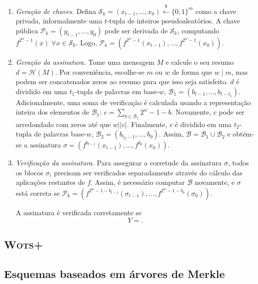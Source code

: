 \documentclass{article}
\newcommand{\pk}{$\mathcal{P}_k$}
\newcommand{\sk}{$\mathcal{S}_k$}
\newcommand{\length}[1]{\vert #1 \vert}
\begin{document}
\begin{enumerate}
    \item[] \emph{Geração de chaves.} Defina $\text{\sk{}} = (x_{t-1}, \dots, x_0) \stackrel{\$}{\longleftarrow} \{0,1\}^m$ como a chave privada, informalmente uma $t$-tupla de inteiros pseudoaleatórios. A chave pública $\text{\pk{}} = (y_{t-1}, \dots, y_0)$ pode ser derivada de \sk{}, computando $f^{2^{w}-1}(x) \; \forall x \in  \text{\sk{}}$. Logo, $\text{\pk{}} = (f^{2^{w}-1}(x_{t-1}), \dots, f^{2^{w}-1}(x_0))$.

    \item[] \emph{Geração da assinatura.} Tome uma mensagem $M$ e calcule o seu resumo $d = \mathcal{H}(M)$. Por conveniência, escolhe-se $m$ ou $w$ de forma que $w \mid m$, mas podem ser concatenados zeros ao resumo para que isso seja satisfeito. $d$ é dividido em uma $t_1$-tupla de palavras em base-$w$, $\mathcal{B}_1 = (b_{t-1}, \dots, b_{t-t_1})$. 
    Adicionalmente, uma soma de verificação é calculada usando a representação inteira dos elementos de $\mathcal{B}_1$: $c = \sum_{b \in \mathcal{B}_1} 2^w - 1 - b$. Novamente, $c$ pode ser arredondado com zeros até que $w \mid \length{c}$. Finalmente, $c$ é dividido em uma $t_2$-tupla de palavras base-$w$, $\mathcal{B}_2 = (b_{t_2-1}, \dots, b_0)$. Assim, $\mathcal{B} = \mathcal{B}_1 \cup \mathcal{B}_2$ e obtém-se a assinatura $\sigma = (f^{b_{t-1}}(x_{t-1}), \dots, f^{b_0}(x_0)).$
    
    \item[] \emph{Verificação da assinatura.} Para assegurar a corretude da assinatura $\sigma$, todos os blocos $\sigma_i$ precisam ser verificados separadamente através do cálculo das aplicações restantes de $f$. Assim, é necessário computar $\mathcal{B}$ novamente, e $\sigma$ está correta se $\text{\pk{}} = (f^{2^w - 1 - b_{t-1}}(\sigma_{t-1}), \dots, f^{2^w - 1 - b_0}(\sigma_0))$.
    
    A assinatura é verificada corretamente se $$Y = .$$

\end{enumerate}

\subsection{\textsc{Wots+}}

\subsection{Esquemas baseados em árvores de Merkle}


 
\end{document}

